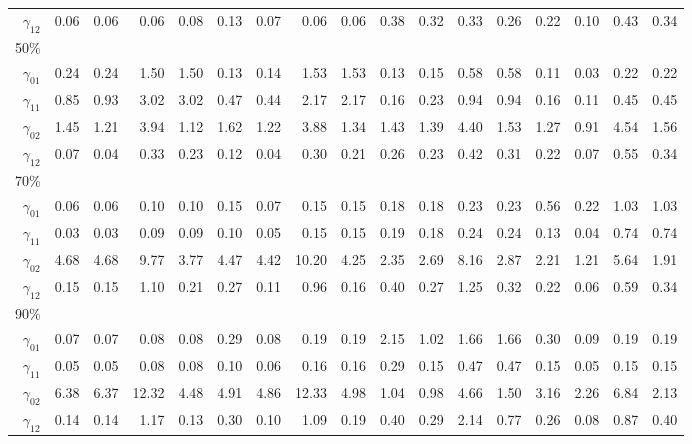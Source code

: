 \documentclass[12pt]{article}
\begin{document}
\begin{table}
\begin{tabular}{r|rrrr|rrrr|rrrr|rrrr}
$\gamma_{12}$ & 0.06 & 0.06 & 0.06 & 0.08 & 0.13 & 0.07 & 0.06 & 0.06 & 0.38 & 0.32 & 0.33 & 0.26 & 0.22 & 0.10 & 0.43 & 0.34 \\
50\% &&&&&&&&&&&&&&&\\
$\gamma_{01}$ & 0.24 & 0.24 & 1.50 & 1.50 & 0.13 & 0.14 & 1.53 & 1.53 & 0.13 & 0.15 & 0.58 & 0.58 & 0.11 & 0.03 & 0.22 & 0.22 \\
$\gamma_{11}$  & 0.85 & 0.93 & 3.02 & 3.02 & 0.47 & 0.44 & 2.17 & 2.17 & 0.16 & 0.23 & 0.94 & 0.94 & 0.16 & 0.11 & 0.45 & 0.45 \\
$\gamma_{02}$  & 1.45 & 1.21 & 3.94 & 1.12 & 1.62 & 1.22 & 3.88 & 1.34 & 1.43 & 1.39 & 4.40 & 1.53 & 1.27 & 0.91 & 4.54 & 1.56 \\
$\gamma_{12}$  & 0.07 & 0.04 & 0.33 & 0.23 & 0.12 & 0.04 & 0.30 & 0.21 & 0.26 & 0.23 & 0.42 & 0.31 & 0.22 & 0.07 & 0.55 & 0.34 \\
70\% &&&&&&&&&&&&&&&\\
$\gamma_{01}$  & 0.06 & 0.06 & 0.10 & 0.10 & 0.15 & 0.07 & 0.15 & 0.15 & 0.18 & 0.18 & 0.23 & 0.23 & 0.56 & 0.22 & 1.03 & 1.03 \\
$\gamma_{11}$  & 0.03 & 0.03 & 0.09 & 0.09 & 0.10 & 0.05 & 0.15 & 0.15 & 0.19 & 0.18 & 0.24 & 0.24 & 0.13 & 0.04 & 0.74 & 0.74 \\
$\gamma_{02}$  & 4.68 & 4.68 & 9.77 & 3.77 & 4.47 & 4.42 & 10.20 & 4.25 & 2.35 & 2.69 & 8.16 & 2.87 & 2.21 & 1.21 & 5.64 & 1.91 \\
$\gamma_{12}$  & 0.15 & 0.15 & 1.10 & 0.21 & 0.27 & 0.11 & 0.96 & 0.16 & 0.40 & 0.27 & 1.25 & 0.32 & 0.22 & 0.06 & 0.59 & 0.34 \\
90\% &&&&&&&&&&&&&&&\\
$\gamma_{01}$  & 0.07 & 0.07 & 0.08 & 0.08 & 0.29 & 0.08 & 0.19 & 0.19 & 2.15 & 1.02 & 1.66 & 1.66 & 0.30 & 0.09 & 0.19 & 0.19 \\
$\gamma_{11}$  & 0.05 & 0.05 & 0.08 & 0.08 & 0.10 & 0.06 & 0.16 & 0.16 & 0.29 & 0.15 & 0.47 & 0.47 & 0.15 & 0.05 & 0.15 & 0.15 \\
$\gamma_{02}$  & 6.38 & 6.37 & 12.32 & 4.48 & 4.91 & 4.86 & 12.33 & 4.98 & 1.04 & 0.98 & 4.66 & 1.50 & 3.16 & 2.26 & 6.84 & 2.13 \\
$\gamma_{12}$  & 0.14 & 0.14 & 1.17 & 0.13 & 0.30 & 0.10 & 1.09 & 0.19 & 0.40 & 0.29 & 2.14 & 0.77 & 0.26 & 0.08 & 0.87 & 0.40 \\
\hline
  \end{tabular}

\end{table}
\end{document}

